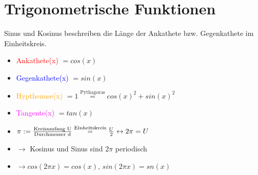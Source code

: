 \documentclass[]{article}
\begin{document}
\pagebreak

\section{Trigonometrische Funktionen}

\begin{definition}[Einheitskreis]
Sinus und Kosinus beschreiben die Länge der Ankathete bzw. Gegenkathete im Einheitskreis.

\begin{multicols}{2}
	\begin{itemize}[label={}, noitemsep]
		\item \textcolor{red}{Ankathete(x)} $= cos(x)$
		\item \textcolor{blue}{Gegenkathete(x)} $= sin(x)$
		\item \textcolor{orange}{Hypthenuse(x)} $= 1 \overset{\text{Pythagoras}}{=} cos(x)^2 + sin(x)^2$	
		\item \textcolor{magenta}{Tangente(x)} $= tan(x)$			
		\item $\pi := \frac{\textnormal{Kreisumfang U}}{\textnormal{Durchmesser d}} \overset{\text{Einheitskreis}}{=} \frac{U}{2} \leftrightarrow 2 \pi = U $
		\item $\rightarrow$ Kosinus und Sinus sind $2 \pi$ periodisch
		\item $\rightarrow cos(2 \pi x) = cos(x)$, $sin(2 \pi x) = sn(x)$
	\end{itemize}
\end{multicols}



\end{definition}
\end{document}
